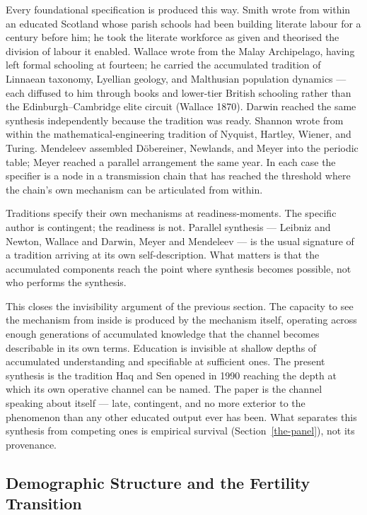 \documentclass[12pt,letterpaper]{article}
\begin{document}
Every foundational specification is produced this way. Smith wrote from
within an educated Scotland whose parish schools had been building
literate labour for a century before him; he took the literate workforce
as given and theorised the division of labour it enabled. Wallace
wrote from the Malay Archipelago, having left formal schooling at
fourteen; he carried the accumulated tradition of Linnaean taxonomy,
Lyellian geology, and Malthusian population dynamics --- each diffused
to him through books and lower-tier British schooling rather than the
Edinburgh--Cambridge elite circuit (Wallace 1870). Darwin reached the
same synthesis independently because the tradition was ready. Shannon
wrote
from within the mathematical-engineering tradition of Nyquist, Hartley,
Wiener, and Turing. Mendeleev assembled Döbereiner, Newlands, and Meyer
into the periodic table; Meyer reached a parallel arrangement the same
year. In each case the specifier is a node in a transmission chain that
has reached the threshold where the chain's own mechanism can be
articulated from within.

Traditions specify their own mechanisms at readiness-moments. The
specific author is contingent; the readiness is not. Parallel synthesis
--- Leibniz and Newton, Wallace and Darwin, Meyer and Mendeleev --- is
the usual signature of a tradition arriving at its own self-description.
What matters is that the accumulated components reach the point where
synthesis becomes possible, not who performs the synthesis.

This closes the invisibility argument of the previous section. The
capacity to see the mechanism from inside is produced by the mechanism
itself, operating across enough generations of accumulated knowledge
that the channel becomes describable in its own terms. Education is
invisible at shallow depths of accumulated understanding and specifiable
at sufficient ones. The present synthesis is the tradition Haq and Sen
opened in 1990 reaching the depth at which its own operative channel
can be named. The paper is the channel speaking about itself --- late,
contingent, and no more exterior to the phenomenon than any other
educated output ever has been. What separates this synthesis from competing ones is empirical survival (Section~\ref{the-panel}), not its provenance.

\subsection{Demographic Structure and the Fertility Transition}\label{demographic-structure-and-the-fertility-transition}
\end{document}
